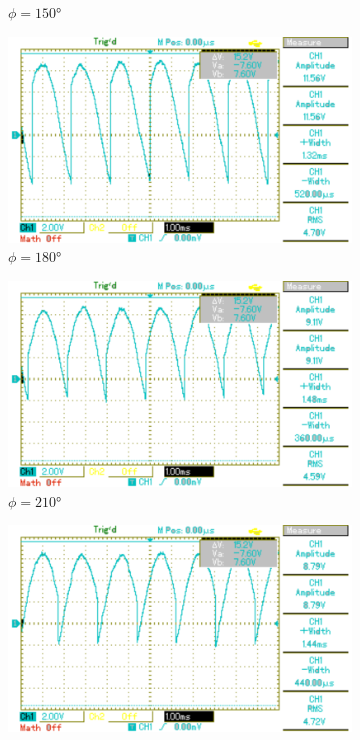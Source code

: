 \begin{figure}[p]
\begin{subfigure}{0.32\textwidth}
		\caption{$\phi=150°$}
	\end{subfigure}
	\begin{subfigure}{0.32\textwidth}
		\includegraphics[width=\textwidth]{Bilder/MAP024.pdf}
		\caption{$\phi=180°$}
	\end{subfigure}
	\begin{subfigure}{0.32\textwidth}
		\includegraphics[width=\textwidth]{Bilder/MAP025.pdf}
		\caption{$\phi=210°$}
	\end{subfigure}
	\begin{subfigure}{0.32\textwidth}
		\includegraphics[width=\textwidth]{Bilder/MAP026.pdf}

\end{subfigure}
\end{figure}
